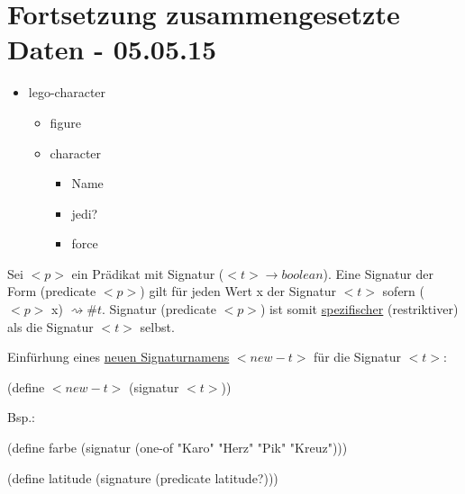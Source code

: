 \documentclass[a4paper, 20pt, openany]{book}
\begin{document}
\chapter{Fortsetzung zusammengesetzte Daten - 05.05.15}

\begin{itemize}
  \item lego-character
    \begin{itemize}
      \item figure
      \item character
        \begin{itemize}
          \item Name
          \item jedi?
          \item force
        \end{itemize}
    \end{itemize}
\end{itemize}

Sei $<p>$ ein Prädikat mit Signatur ($<t> \rightarrow boolean$). Eine Signatur der Form (predicate $<p>$) gilt für jeden Wert x der Signatur $<t>$ sofern ($<p>$ x) $\rightsquigarrow \#t$.
Signatur (predicate $<p>$) ist somit \underline{spezifischer} (restriktiver) als die Signatur $<t>$ selbst. 

Einfürhung eines \underline{neuen Signaturnamens} $<new-t>$ für die Signatur $<t>$: 

\begin{center}
  (define $<new-t>$ (signatur $<t>$))
\end{center}

Bsp.: 

\begin{center}
  (define farbe (signatur (one-of "Karo" "Herz" "Pik" "Kreuz")))
\end{center}

\begin{center}
  (define latitude (signature (predicate latitude?)))
\end{center}
\end{document}
